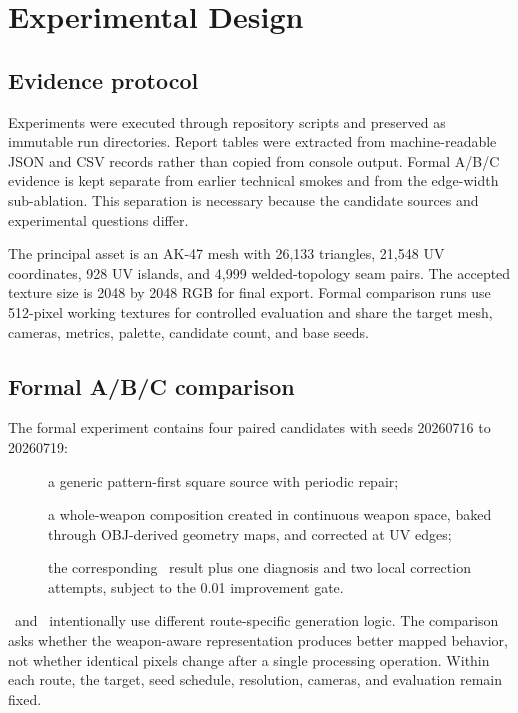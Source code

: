 \section{Experimental Design}
\label{sec:experiments}

\subsection{Evidence protocol}

Experiments were executed through repository scripts and preserved as immutable
run directories. Report tables were extracted from machine-readable JSON and CSV
records rather than copied from console output. Formal A/B/C evidence is kept
separate from earlier technical smokes and from the edge-width sub-ablation. This
separation is necessary because the candidate sources and experimental questions
differ.

The principal asset is an AK-47 mesh with 26,133 triangles, 21,548 UV coordinates,
928 UV islands, and 4,999 welded-topology seam pairs. The accepted texture size is
2048 by 2048 RGB for final export. Formal comparison runs use 512-pixel working
textures for controlled evaluation and share the target mesh, cameras, metrics,
palette, candidate count, and base seeds.

\subsection{Formal A/B/C comparison}

The formal experiment contains four paired candidates with seeds 20260716 to
20260719:

\begin{description}
  \item[\routeA] a generic pattern-first square source with periodic repair;
  \item[\routeB] a whole-weapon composition created in continuous weapon space,
  baked through OBJ-derived geometry maps, and corrected at UV edges;
  \item[\routeC] the corresponding \routeB\ result plus one diagnosis and two local
  correction attempts, subject to the 0.01 improvement gate.
\end{description}

\routeA\ and \routeB\ intentionally use different route-specific generation logic.
The comparison asks whether the weapon-aware representation produces better
mapped behavior, not whether identical pixels change after a single processing
operation. Within each route, the target, seed schedule, resolution, cameras, and
evaluation remain fixed.

